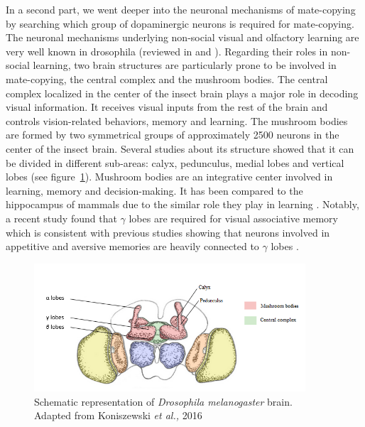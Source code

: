 \documentclass[a4paper, 12pt]{article}
\begin{document}
In a second part, we went deeper into the neuronal mechanisms of mate-copying by searching which group of dopaminergic neurons is required for mate-copying. The neuronal mechanisms underlying non-social visual and olfactory learning are very well known in drosophila (reviewed in \textcite{guo_vision_2017} and \textcite{cognigni_right_2018}). Regarding their roles in non-social learning, two brain structures are particularly prone to be involved in mate-copying, the central complex and the mushroom bodies. The central complex localized in the center of the insect brain plays a major role in decoding visual information. It receives visual inputs from the rest of the brain and controls vision-related behaviors, memory and learning. The mushroom bodies are formed by two symmetrical groups of approximately 2500 neurons in the center of the insect brain. Several studies about its structure showed that it can be divided in different sub-areas: calyx, pedunculus, medial lobes and vertical lobes \parencite{aso_neuronal_2014} (see figure~\ref{fig:brain}). Mushroom bodies are an integrative center involved in learning, memory and decision-making. It has been compared to the hippocampus of mammals due to the similar role they play in learning \parencite{strausfeld_evolution_1998}.
Notably, a recent study found that \(\gamma\) lobes are required for visual associative memory \parencite{ vogt_shared_2014} which is consistent with previous studies showing that neurons involved in appetitive and aversive memories are heavily connected to \(\gamma\) lobes \parencite{claridge_writing_2009, burke_layered_2012}. 

	\begin{figure}
	\centering
	\includegraphics[width=0.9\textwidth]{images/brain}
	\caption{Schematic representation of \textit{Drosophila melanogaster} brain.\\
		Adapted from Koniszewski \textit{et al.,} 2016
		}
	\label{fig:brain}
\end{figure}
\end{document}
